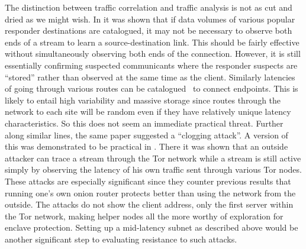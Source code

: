 \documentclass{llncs}
\begin{document}
The distinction between traffic correlation and traffic analysis is
not as cut and dried as we might wish. In \cite{hintz-pet02} it was
shown that if data volumes of various popular
responder destinations are catalogued, it may not be necessary to
observe both ends of a stream to learn a source-destination link.
This should be fairly effective without simultaneously observing both
ends of the connection. However, it is still essentially confirming
suspected communicants where the responder suspects are ``stored'' rather
than observed at the same time as the client.
Similarly latencies of going through various routes can be
catalogued~\cite{back01} to connect endpoints.
This is likely to entail high variability and massive storage since
%
routes through the network to each site will be random even if they
have relatively unique latency characteristics. So this does
not seem an immediate practical threat. Further along similar lines,
the same paper suggested a ``clogging attack''. A version of this
was demonstrated to be practical in
\cite{attack-tor-oak05}. There it was shown that an outside attacker can
trace a stream through the Tor network while a stream is still active
simply by observing the latency of his own traffic sent through
various Tor nodes. These attacks are especially significant since they
counter previous results that running one's own onion router protects
better than using the network from the outside. The attacks do not
show the client address, only the first server within the Tor network,
making helper nodes all the more worthy of exploration for enclave
protection. Setting up a mid-latency subnet as described above would
be another significant step to evaluating resistance to such attacks.
\end{document}
